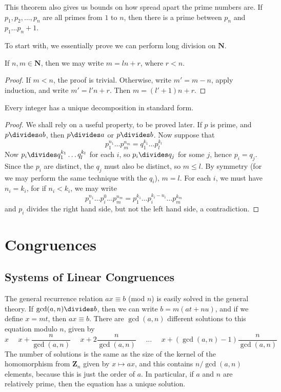 This theorem also gives us bounds on how spread apart the prime numbers are. If $p_1, p_2, \dots, p_n$ are all primes from $1$ to $n$, then there is a prime between $p_n$ and $p_1 \dots p_n + 1$.

To start with, we essentially prove we can perform long division on $\mathbf{N}$.

\begin{lemma}
    If $n,m \in \mathbf{N}$, then we may write $m = ln + r$, where $r < n$.
\end{lemma}
\begin{proof}
    If $m < n$, the proof is trivial. Otherwise, write $m' = m - n$, apply induction, and write $m' = l'n + r$. Then $m = (l' + 1)n + r$.
\end{proof}

\begin{theorem}
    Every integer has a unique decomposition in standard form.
\end{theorem}
\begin{proof}
    We shall rely on a useful property, to be proved later. If $p$ is prime, and $p \divides ab$, then $p \divides a$ or $p \divides b$. Now suppose that
    \[ p_1^{n_1} \dots p_m^{n_m} = q_1^{k_1} \dots p_l^{k_l} \]
    Now $p_i \divides q_1^{k_1} \dots q_l^{k_l}$ for each $i$, so $p_i \divides q_j$ for some $j$, hence $p_i = q_j$. Since the $p_i$ are distinct, the $q_j$ must also be distinct, so $m \leq l$. By symmetry (for we may perform the same technique with the $q_i$), $m = l$. For each $i$, we must have $n_i = k_i$, for if $n_i < k_i$, we may write
    \[ p_1^{n_1} \dots p_i^0 \dots p_m^{n_m} = p_1^{k_1} \dots p_i^{k_i - n_i} \dots p_m^{k_m} \]
    and $p_i$ divides the right hand side, but not the left hand side, a contradiction.
\end{proof}

\chapter{Congruences}

\section{Systems of Linear Congruences}

The general recurrence relation $ax \equiv b$ (mod $n$) is easily solved in the general theory. If $\gcd(a,n) \divides b$, then we can write $b = m(at + nu)$, and if we define $x = mt$, then $ax \equiv b$. There are $\gcd(a,n)$ different solutions to this equation modulo $n$, given by
%
\[ x\ \ \ \ \ \ x + \frac{n}{\gcd(a,n)}\ \ \ \ \ \ x + 2 \frac{n}{\gcd(a,n)}\ \ \ \ \ \ \dots\ \ \ \ \ \ x + (\gcd(a,n) - 1) \frac{n}{\gcd(a,n)} \]
%
The number of solutions is the same as the size of the kernel of the homomorphism from $\mathbf{Z}_n$ given by $x \mapsto ax$, and this contains $n/\gcd(a,n)$ elements, because this is just the order of $a$. In particular, if $a$ and $n$ are relatively prime, then the equation has a unique solution.

